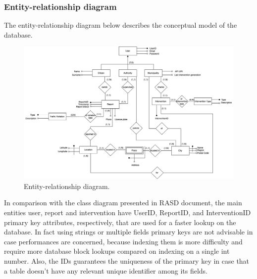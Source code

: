 \subsubsection{Entity-relationship diagram}
The entity-relationship diagram below describes the conceptual model of the database.

\begin{figure}[H]
	\centering
	\includegraphics[width=\linewidth]{Images/ER_diagram.png}
	\caption{Entity-relationship diagram.}
\end{figure}

In comparison with the class diagram presented in RASD document, the main entities user, report and intervention have UserID, ReportID, and InterventionID primary key attributes, respectively, that are used for a faster lookup on the database. In fact using strings or multiple fields primary keys are not advisable in case performances are concerned, because indexing them is more difficulty and require more database block lookups compared on indexing on a single int number. Also, the IDs guarantees the uniqueness of the primary key in case that a table doesn't have any relevant unique identifier among its fields.

